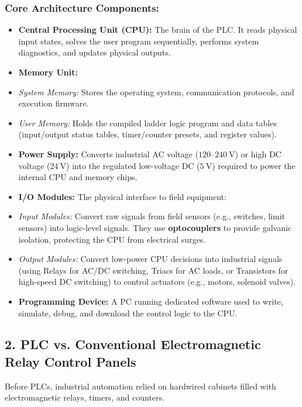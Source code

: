 \subsubsection{Core Architecture Components:}
\begin{itemize}
  \item \textbf{Central Processing Unit (CPU):} The brain of the PLC. It reads physical input states, solves the user program sequentially, performs system diagnostics, and updates physical outputs.
  \item \textbf{Memory Unit:}
  \item \textit{System Memory:} Stores the operating system, communication protocols, and execution firmware.
  \item \textit{User Memory:} Holds the compiled ladder logic program and data tables (input/output status tables, timer/counter presets, and register values).
  \item \textbf{Power Supply:} Converts industrial AC voltage ($120\text{--}240\ \text{V}$) or high DC voltage ($24\ \text{V}$) into the regulated low-voltage DC ($5\ \text{V}$) required to power the internal CPU and memory chips.
  \item \textbf{I/O Modules:} The physical interface to field equipment:
  \item \textit{Input Modules:} Convert raw signals from field sensors (e.g., switches, limit sensors) into logic-level signals. They use \textbf{optocouplers} to provide galvanic isolation, protecting the CPU from electrical surges.
  \item \textit{Output Modules:} Convert low-power CPU decisions into industrial signals (using Relays for AC/DC switching, Triacs for AC loads, or Transistors for high-speed DC switching) to control actuators (e.g., motors, solenoid valves).
  \item \textbf{Programming Device:} A PC running dedicated software used to write, simulate, debug, and download the control logic to the CPU.
\end{itemize}


\subsection{2. PLC vs. Conventional Electromagnetic Relay Control Panels}
Before PLCs, industrial automation relied on hardwired cabinets filled with electromagnetic relays, timers, and counters.

